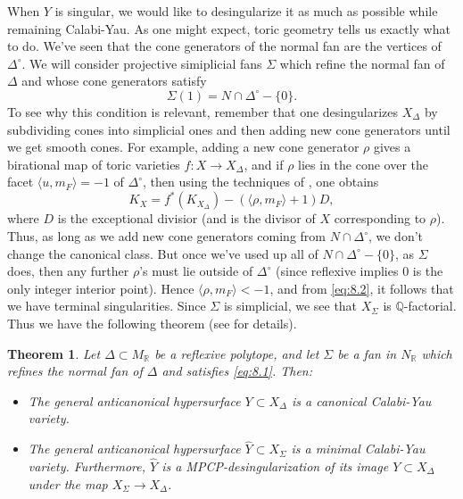 \documentclass{amsart}
\theoremstyle{plain}
\newtheorem{theorem}{Theorem}[section]
\theoremstyle{definition}
\begin{document}
	When $Y$ is singular, we would like to desingularize it as
much as possible while remaining Calabi-Yau.  As one might expect,
toric geometry tells us exactly what to do.  We've seen that the cone
generators of the normal fan are the vertices of $\Delta^\circ$.  We will
consider projective simiplicial fans $\Sigma$ which refine the normal
fan of $\Delta$ and whose cone generators satisfy
\begin{equation}
\Sigma(1) = N\cap \Delta^\circ - \{0\}.
\tag{8.1}\label{eq:8.1}
\end{equation}
To see why this condition is relevant, remember that one
desingularizes $X_\Delta$ by subdividing cones into simplicial ones
and then adding new cone generators until we get smooth cones.  For
example, adding a new cone generator $\rho$ gives a birational map of
toric varieties $f : X \to X_\Delta$, and if $\rho$ lies in the cone
over the facet $\langle u,m_F\rangle = -1$ of $\Delta^\circ$, then
using the techniques of \cite{Rei5}, one obtains
\begin{equation}
K_{X} = f^*(K_{X_\Delta}) - (\langle \rho,m_F\rangle +
1)D,
\tag{8.2}\label{eq:8.2}
\end{equation}
where $D$ is the exceptional divisior (and is the divisor of $X$
corresponding to $\rho$).  Thus, as long as we add new cone
generators coming from $N\cap\Delta^\circ$, we don't change the canonical
class.  But once we've used up all of $N\cap \Delta^\circ -
\{0\}$, as $\Sigma$ does, then any further $\rho$'s must lie
outside of $\Delta^\circ$ (since reflexive implies $0$ is the only integer
interior point).  Hence $\langle\rho,m_F\rangle < -1$, and from
\eqref{eq:8.2}, it follows that we have terminal singularities.  Since
$\Sigma$ is simplicial, we see that $X_\Sigma$ is $\mathbb{Q}$-factorial.  Thus we have the following theorem (see \cite{Bat1}
for details).

\begin{theorem} Let $\Delta \subset M_\mathbb{R}$ be a reflexive
polytope, and let $\Sigma$ be a fan in $N_\mathbb{R}$ which refines the
normal fan of $\Delta$ and satisfies \eqref{eq:8.1}.  Then:
\begin{itemize}
\item The general anticanonical hypersurface $Y \subset X_\Delta$ is a
canonical Calabi-Yau variety.
\item The general anticanonical hypersurface $\widehat Y \subset
X_\Sigma$ is a minimal Calabi-Yau variety.  Furthermore, $\widehat Y$
is a MPCP-desingularization of its image $Y \subset X_\Delta$ under
the map $X_\Sigma \to X_\Delta$.
\end{itemize}
\end{theorem}
\end{document}
